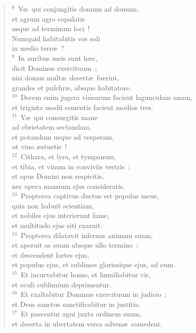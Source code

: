 \begin{flushleft}\begin{verse}${}^{8}$~V\ae\ qui conjungitis domum ad domum,\\ et agrum agro copulatis\\ usque ad terminum loci~!\\ Numquid habitabitis vos soli\\ in medio terr\ae~?\\
${}^{9}$~In auribus meis sunt h\ae c,\\ dicit Dominus exercituum~;\\ nisi domus mult\ae\ desert\ae\ fuerint,\\ grandes et pulchr\ae , absque habitatore.\\
${}^{10}$~Decem enim jugera vinearum facient lagunculam unam,\\ et triginta modii sementis facient modios tres.\\
${}^{11}$~V\ae\ qui consurgitis mane\\ ad ebrietatem sectandam,\\ et potandum usque ad vesperam,\\ ut vino \ae stuetis~!\\
${}^{12}$~Cithara, et lyra, et tympanum,\\ et tibia, et vinum in conviviis vestris~;\\ et opus Domini non respicitis,\\ nec opera manuum ejus consideratis.\\
${}^{13}$~Propterea captivus ductus est populus meus,\\ quia non habuit scientiam,\\ et nobiles ejus interierunt fame,\\ et multitudo ejus siti exaruit.\\
${}^{14}$~Propterea dilatavit infernus animam suam,\\ et aperuit os suum absque ullo termino~;\\ et descendent fortes ejus,\\ et populus ejus, et sublimes gloriosique ejus, ad eum.\\
${}^{15}$~Et incurvabitur homo, et humiliabitur vir,\\ et oculi sublimium deprimentur.\\
${}^{16}$~Et exaltabitur Dominus exercituum in judicio~;\\ et Deus sanctus sanctificabitur in justitia.\\
${}^{17}$~Et pascentur agni juxta ordinem suum,\\ et deserta in ubertatem versa adven\ae\ comedent.\end{verse}\end{flushleft}


